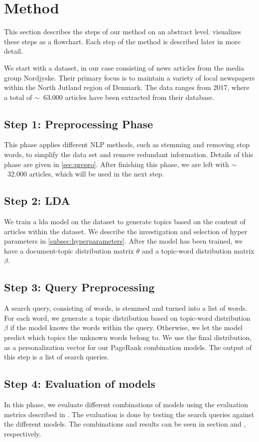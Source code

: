\section{Method}\label{sec:method}
This section describes the steps of our method on an abstract level.
 visualizes these steps as a flowchart.
Each step of the method is described later in more detail. 

We start with a dataset, in our case consisting of news articles from the media group Nordjyske. 
Their primary focus is to maintain a variety of local newspapers within the North Jutland region of Denmark. 
The data ranges from 2017, where a total of $\sim$~63.000 articles have been extracted from their database.

\subsection*{Step 1: Preprocessing Phase}
This phase applies different \gls{NLP} methods, such as stemming and removing stop words, to simplify the data set and remove redundant information.
Details of this phase are given in \autoref{sec:prepro}.
After finishing this phase, we are left with $\sim$~32.000 articles, which will be used in the next step.

\subsection*{Step 2: LDA}
We train a \acrfull{lda} model on the dataset to generate topics based on the content of articles within the dataset. 
We describe the investigation and selection of hyper parameters in \autoref{subsec:hyperparameters}. 
After the model has been trained, we have a document-topic distribution matrix $\theta$ and a topic-word distribution matrix $\beta$.

\subsection*{Step 3: Query Preprocessing}
A search query, consisting of words, is stemmed and turned into a list of words.
For each word, we generate a topic distribution based on topic-word distribution $\beta$ if the model knows the words within the query.
Otherwise, we let the model predict which topics the unknown words belong to.
We use the final distribution, as a personalization vector for our PageRank combination models.
The output of this step is a list of search queries.


\subsection*{Step 4: Evaluation of models}
In this phase, we evaluate different combinations of models using the evaluation metrics described in .
The evaluation is done by testing the search queries against the different models. 
The combinations and results can be seen in section  and , respectively.



